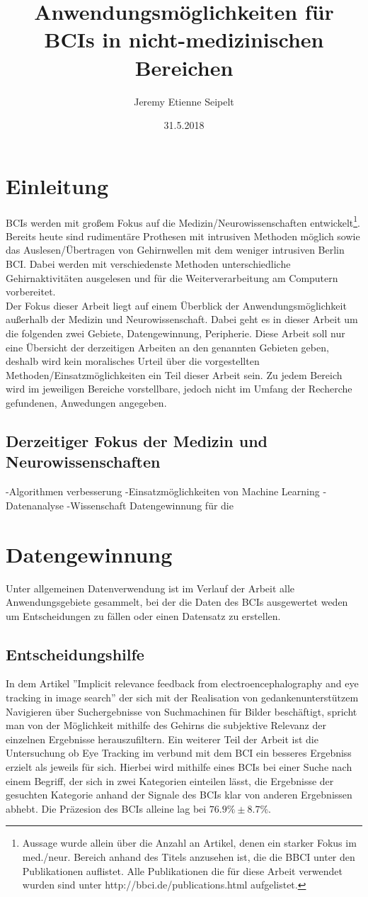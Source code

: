 \documentclass[11pt]{article} %
\title{Anwendungsmöglichkeiten für BCIs in nicht-medizinischen Bereichen}
\author{Jeremy Etienne Seipelt}
\date{31.5.2018} %
\begin{document}
\maketitle

\section{Einleitung}
BCIs werden mit großem Fokus auf die Medizin/Neurowissenschaften entwickelt\footnote{Aussage wurde allein über die Anzahl an Artikel, denen ein starker Fokus im med./neur. Bereich anhand des Titels anzusehen ist, die die BBCI unter den Publikationen auflistet. Alle Publikationen die für diese Arbeit verwendet wurden sind unter http://bbci.de/publications.html aufgelistet.}. Bereits heute sind rudimentäre Prothesen mit intrusiven Methoden möglich sowie das Auslesen/Übertragen von Gehirnwellen mit dem weniger intrusiven Berlin BCI\cite{FEHLT}. Dabei werden mit verschiedenste Methoden unterschiedliche Gehirnaktivitäten ausgelesen und für die Weiterverarbeitung am Computern vorbereitet.\\ Der Fokus dieser Arbeit liegt auf einem Überblick der Anwendungsmöglichkeit außerhalb der Medizin und Neurowissenschaft. Dabei geht es in dieser Arbeit um die folgenden zwei Gebiete, Datengewinnung, Peripherie. Diese Arbeit soll nur eine Übersicht der derzeitigen Arbeiten an den genannten Gebieten geben, deshalb wird kein moralisches Urteil über die vorgestellten Methoden/Einsatzmöglichkeiten ein Teil dieser Arbeit sein. Zu jedem Bereich wird im jeweiligen Bereiche vorstellbare, jedoch nicht im Umfang der Recherche gefundenen, Anwedungen angegeben. 
\subsection{Derzeitiger Fokus der Medizin und Neurowissenschaften}
-Algorithmen verbesserung
-Einsatzmöglichkeiten von Machine Learning 
-Datenanalyse
-Wissenschaft Datengewinnung für die 
\section{Datengewinnung}
Unter allgemeinen Datenverwendung ist im Verlauf der Arbeit alle Anwendungsgebiete gesammelt, bei der die Daten des BCIs  ausgewertet weden um Entscheidungen zu fällen oder einen Datensatz zu erstellen.  
\subsection{Entscheidungshilfe}
In dem Artikel ''Implicit relevance feedback from electroencephalography and eye tracking in image search'' der sich mit der Realisation von gedankenunterstützem Navigieren über Suchergebnisse von Suchmachinen für Bilder beschäftigt, spricht man von der Möglichkeit mithilfe des Gehirns die subjektive Relevanz der einzelnen Ergebnisse herauszufiltern. Ein weiterer Teil der Arbeit ist die Untersuchung ob Eye Tracking im verbund mit dem BCI ein besseres Ergebniss erzielt als jeweils für sich.
Hierbei wird mithilfe eines BCIs bei einer Suche nach einem Begriff, der sich in zwei Kategorien einteilen lässt, die Ergebnisse der gesuchten Kategorie anhand der Signale des BCIs klar von anderen Ergebnissen abhebt. Die Präzesion des BCIs alleine lag bei  $76.9\% \pm 8.7\% $.
\end{document}
